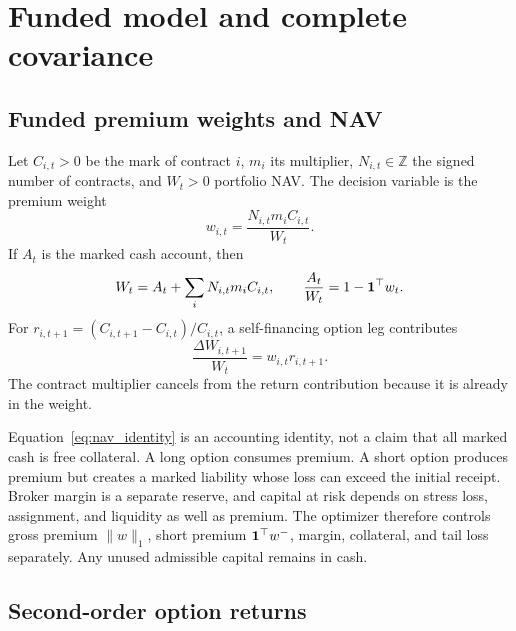 \FloatBarrier
\section{Funded model and complete covariance}

\subsection{Funded premium weights and NAV}

Let \(C_{i,t}>0\) be the mark of contract \(i\), \(m_i\) its multiplier,
\(N_{i,t}\in\mathbb Z\) the signed number of contracts, and \(W_t>0\) portfolio NAV.
The decision variable is the premium weight
\begin{equation}
  w_{i,t}=\frac{N_{i,t}m_iC_{i,t}}{W_t}.
  \label{eq:premium_weight}
\end{equation}
If \(A_t\) is the marked cash account, then
\begin{equation}
  W_t=A_t+\sum_i N_{i,t}m_iC_{i,t},
  \qquad
  \frac{A_t}{W_t}=1-\mathbf{1}^\top w_t.
  \label{eq:nav_identity}
\end{equation}
For \(r_{i,t+1}=(C_{i,t+1}-C_{i,t})/C_{i,t}\), a self-financing option leg contributes
\begin{equation}
  \frac{\Delta W_{i,t+1}}{W_t}=w_{i,t}r_{i,t+1}.
  \label{eq:nav_return}
\end{equation}
The contract multiplier cancels from the return contribution because it is already in
the weight.

Equation~\eqref{eq:nav_identity} is an accounting identity, not a claim that all marked
cash is free collateral. A long option consumes premium. A short option produces premium
but creates a marked liability whose loss can exceed the initial receipt. Broker margin
is a separate reserve, and capital at risk depends on stress loss, assignment, and
liquidity as well as premium. The optimizer therefore controls gross premium
\(\|w\|_1\), short premium \(\mathbf{1}^\top w^-\), margin, collateral, and tail loss separately.
Any unused admissible capital remains in cash.

\subsection{Second-order option returns}

